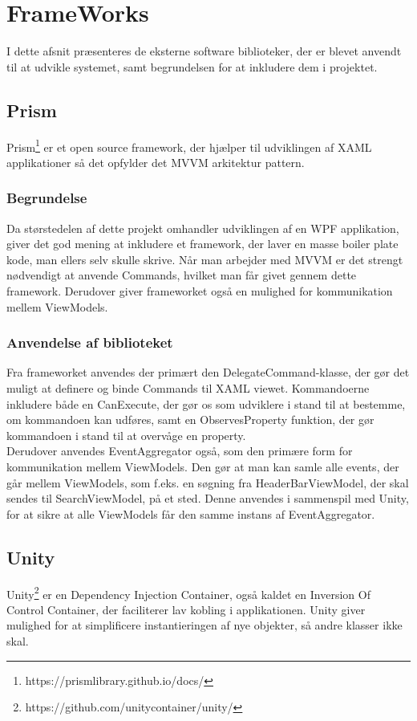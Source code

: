 \documentclass[Implementering/Implementering_main.tex]{subfiles}
\begin{document}
\section{FrameWorks}
I dette afsnit præsenteres de eksterne software biblioteker, der er blevet anvendt til at udvikle systemet, samt begrundelsen for at inkludere dem i projektet.

\subsection{Prism}
Prism\footnote{https://prismlibrary.github.io/docs/} er et open source framework, der hjælper til udviklingen af XAML applikationer så det opfylder det MVVM arkitektur pattern. 
\subsubsection{Begrundelse}
Da størstedelen af dette projekt omhandler udviklingen af en WPF applikation, giver det god mening at inkludere et framework, der laver en masse boiler plate kode, man ellers selv skulle skrive. Når man arbejder med MVVM er det strengt nødvendigt at anvende Commands, hvilket man får givet gennem dette framework. Derudover giver frameworket også en mulighed for kommunikation mellem ViewModels.
\subsubsection{Anvendelse af biblioteket}
Fra frameworket anvendes der primært den DelegateCommand-klasse, der gør det muligt at definere og binde Commands til XAML viewet. Kommandoerne inkludere både en CanExecute, der gør os som udviklere i stand til at bestemme, om kommandoen kan udføres, samt en ObservesProperty funktion, der gør kommandoen i stand til at overvåge en property.\\
Derudover anvendes EventAggregator også, som den primære form for kommunikation mellem ViewModels. Den gør at man kan samle alle events, der går mellem ViewModels, som f.eks. en søgning fra HeaderBarViewModel, der skal sendes til SearchViewModel, på et sted. Denne anvendes i sammenspil med Unity, for at sikre at alle ViewModels får den samme instans af EventAggregator.

\subsection{Unity}
Unity\footnote{https://github.com/unitycontainer/unity/} er en Dependency Injection Container, også kaldet en Inversion Of Control Container, der faciliterer lav kobling i applikationen. Unity giver mulighed for at simplificere instantieringen af nye objekter, så andre klasser ikke skal. 
\end{document}
